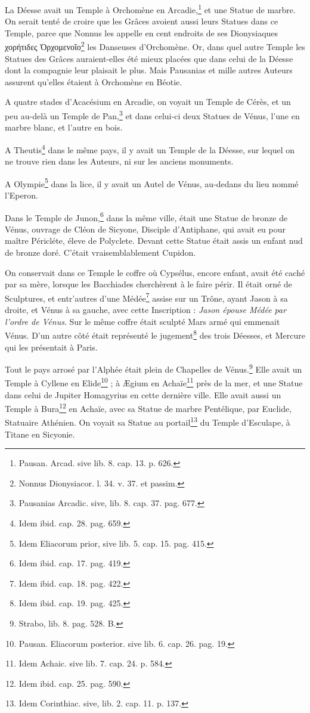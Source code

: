 \documentclass[a4paper, 11pt, oneside, polutonikogreek, french]{article}
\begin{document}
La Déesse avait un Temple à Orchomène en Arcadie,\footnote{Pausan. Arcad. sive lib. 8. cap. 13. p. 626.} et une Statue de marbre. On serait tenté de croire que les Grâces avoient aussi leurs Statues dans ce Temple, parce que Nonnus les appelle en cent endroits de ses Dionysiaques χορήτιδες Ὀρχομενοῖο\footnote{Nonnus Dionysiacor. l. 34. v. 37. et passim.} les Danseuses d'Orchomène. Or, dans quel autre Temple les Statues des Grâces auraient-elles été mieux placées que dans celui de la Déesse dont la compagnie leur plaisait le plus. Mais Pausanias et mille autres Auteurs assurent qu'elles étaient à Orchomène en Béotie.

A quatre stades d'Acacésium en Arcadie, on voyait un Temple de Cérès, et un peu au-delà un Temple de Pan,\footnote{Pausanias Arcadic. sive, lib. 8. cap. 37. pag. 677.} et dans celui-ci deux Statues de Vénus, l'une en marbre blanc, et l'autre en bois.

A Theutis\footnote{Idem ibid. cap. 28. pag. 659.} dans le même pays, il y avait un Temple de la Déesse, sur lequel on ne trouve rien dans les Auteurs, ni sur les anciens monuments.

A Olympie\footnote{Idem Eliacorum prior, sive lib. 5. cap. 15. pag. 415.} dans la lice, il y avait un Autel de Vénus, au-dedans du lieu nommé l'Eperon.

Dans le Temple de Junon,\footnote{Idem ibid. cap. 17. pag. 419.} dans la même ville, était une Statue de bronze de Vénus, ouvrage de Cléon de Sicyone, Disciple d'Antiphane, qui avait eu pour maître Péricléte, éleve de Polyclete. Devant cette Statue était assis un enfant nud de bronze doré. C'était vraisemblablement Cupidon.

On conservait dans ce Temple le coffre où Cypsélus, encore enfant, avait été caché par sa mère, lorsque les Bacchiades cherchèrent à le faire périr. Il était orné de Sculptures, et entr'autres d'une Médée\footnote{Idem ibid. cap. 18. pag. 422.} assise sur un Trône, ayant Jason à sa droite, et Vénus à sa gauche, avec cette Inscription : \emph{Jason épouse Médée par l'ordre de Vénus}. Sur le même coffre était sculpté Mars armé qui emmenait Vénus. D'un autre côté était représenté le jugement\footnote{Idem ibid. cap. 19. pag. 425.} des trois Déesses, et Mercure qui les présentait à Paris.

Tout le pays arrosé par l'Alphée était plein de Chapelles de Vénus.\footnote{Strabo, lib. 8. pag. 528. B.} Elle avait un Temple à Cyllene en Elide\footnote{Pausan. Eliacorum posterior. sive lib. 6. cap. 26. pag. 19.} ; à Ægium en Achaïe\footnote{Idem Achaic. sive lib. 7. cap. 24. p. 584.} près de la mer, et une Statue dans celui de Jupiter Homagyrius en cette dernière ville. Elle avait aussi un Temple à Bura\footnote{Idem ibid. cap. 25. pag. 590.} en Achaïe, avec sa Statue de marbre Pentélique, par Euclide, Statuaire Athénien. On voyait sa Statue au portail\footnote{Idem Corinthiac. sive, lib. 2. cap. 11. p. 137.} du Temple d'Esculape, à Titane en Sicyonie.
\end{document}
